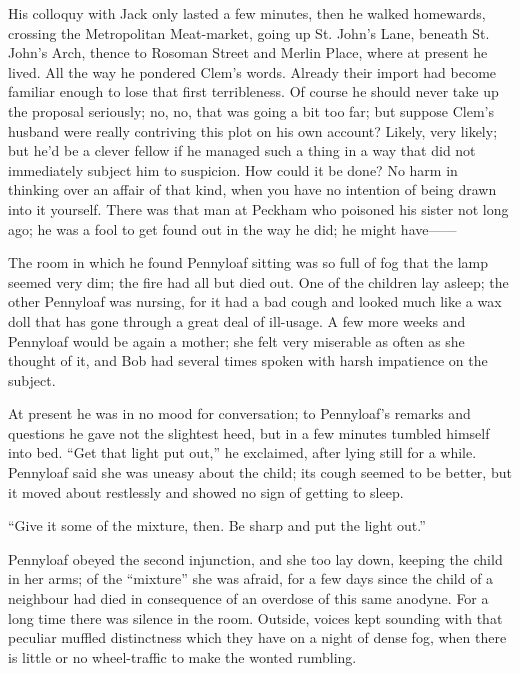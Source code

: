 His colloquy with Jack only lasted a few minutes, then he walked
homewards, crossing the Metropolitan Meat-market, going up St. John's
Lane, beneath St. John's Arch, thence to Rosoman Street and Merlin
Place, where at present he lived. All the way he pondered Clem's words.
Already their import had become {\protect\hypertarget{39}{}{}}familiar
enough to lose that first terribleness. Of course he should never take
up the proposal seriously; no, no, that was going a bit too far; but
suppose Clem's husband were really contriving this plot on his own
account? Likely, very likely; but he'd be a clever fellow if he managed
such a thing in a way that did not immediately subject him to suspicion.
How could it be done? No harm in thinking over an affair of that kind,
when you have no intention of being drawn into it yourself. There was
that man at Peckham who poisoned his sister not long ago; he was a fool
to get found out in the way he did; he might {have{{------}}}

The room in which he found Pennyloaf sitting was so full of fog that the
lamp seemed very dim; the fire had all but died out. One of the children
lay asleep; the other Pennyloaf was nursing, for it had a bad cough and
looked much like a wax doll that has gone through a great deal of
ill-usage. A few more weeks and Pennyloaf would be again a mother; she
felt very miserable as often as she thought of it, and Bob had several
times spoken with harsh impatience on the subject.

At present he was in no mood for
{\protect\hypertarget{40}{}{}}conversation; to Pennyloaf's remarks and
questions he gave not the slightest heed, but in a few minutes tumbled
himself into bed. ``Get that light put out,'' he exclaimed, after lying
still for a while. Pennyloaf said she was uneasy about the child; its
cough seemed to be better, but it moved about restlessly and showed no
sign of getting to sleep.

``Give it some of the mixture, then. Be sharp and put the light out.''

Pennyloaf obeyed the second injunction, and she too lay down, keeping
the child in her arms; of the ``mixture'' she was afraid, for a few days
since the child of a neighbour had died in consequence of an overdose of
this same anodyne. For a long time there was silence in the room.
Outside, voices kept sounding with that peculiar muffled distinctness
which they have on a night of dense fog, when there is little or no
wheel-traffic to make the wonted rumbling.

